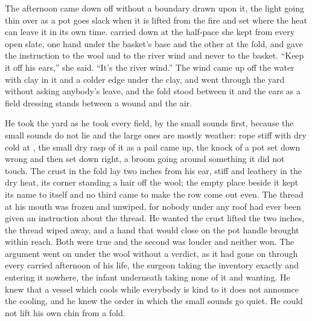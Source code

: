 The afternoon came down off  without a boundary drawn upon it, the light going thin over  as a pot goes slack when it is lifted from the fire and set where the heat can leave it in its own time.  carried  down at the half-pace she kept from every open slate, one hand under the basket's base and the other at the fold, and gave the instruction to the wool and to the river wind and never to the basket. “Keep it off his ears,” she said. “It's the river wind.” The wind came up off the water with clay in it and a colder edge under the clay, and went through the yard without asking anybody's leave, and the fold stood between it and the ears as a field dressing stands between a wound and the air.

He took the yard as he took every field, by the small sounds first, because the small sounds do not lie and the large ones are mostly weather: rope stiff with dry cold at , the small dry rasp of it as a pail came up, the knock of a pot set down wrong and then set down right, a broom going around something it did not touch. The crust in the fold lay two inches from his ear, stiff and leathery in the dry heat, its corner standing a hair off the wool; the empty place beside it kept its name to itself and no third came to make the row come out even. The thread at his mouth was frozen and unwiped, for nobody under any roof had ever been given an instruction about the thread. He wanted the crust lifted the two inches, the thread wiped away, and a hand that would close on the pot handle brought within reach. Both were true and the second was louder and neither won. The argument went on under the wool without a verdict, as it had gone on through every carried afternoon of his life, the surgeon taking the inventory exactly and entering it nowhere, the infant underneath taking none of it and wanting. He knew that a vessel which cools while everybody is kind to it does not announce the cooling, and he knew the order in which the small sounds go quiet. He could not lift his own chin from a fold.

